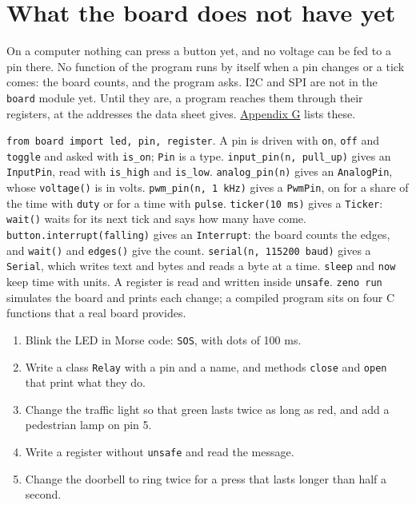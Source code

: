 \section{What the board does not have yet}

On a computer nothing can press a button yet, and no voltage can be
fed to a pin there. No function of the program runs by itself when a
pin changes or a tick comes: the board counts, and the program asks.
I2C and SPI are not in the \verb|board| module yet. Until they are, a
program reaches them through their registers, at the addresses the data sheet gives.
\hyperref[app-limits]{Appendix G} lists these.

\begin{summary}
\verb|from board import led, pin, register|. A pin is driven with
\verb|on|, \verb|off| and \verb|toggle| and asked with \verb|is_on|;
\verb|Pin| is a type. \verb|input_pin(n, pull_up)| gives an
\verb|InputPin|, read with \verb|is_high| and \verb|is_low|.
\verb|analog_pin(n)| gives an \verb|AnalogPin|, whose \verb|voltage()|
is in volts. \verb|pwm_pin(n, 1 kHz)| gives a \verb|PwmPin|, on for a
share of the time with \verb|duty| or for a time with \verb|pulse|.
\verb|ticker(10 ms)| gives a \verb|Ticker|: \verb|wait()| waits for its
next tick and says how many have come. \verb|button.interrupt(falling)|
gives an \verb|Interrupt|: the board counts the edges, and
\verb|wait()| and \verb|edges()| give the count.
\verb|serial(n, 115200 baud)| gives a \verb|Serial|, which
writes text and bytes and reads a byte at a time. \verb|sleep| and \verb|now| keep time with units.
A register is read and written inside \verb|unsafe|. \verb|zeno run|
simulates the board and prints each change; a compiled program sits on
four C functions that a real board provides.
\end{summary}

\begin{tryit}
\begin{enumerate}
\item Blink the LED in Morse code: \verb|SOS|, with dots of 100 ms.
\item Write a class \verb|Relay| with a pin and a name, and methods
  \verb|close| and \verb|open| that print what they do.
\item Change the traffic light so that green lasts twice as long as
  red, and add a pedestrian lamp on pin 5.
\item Write a register without \verb|unsafe| and read the message.
\item Change the doorbell to ring twice for a press that lasts longer
  than half a second.
\end{enumerate}
\end{tryit}
